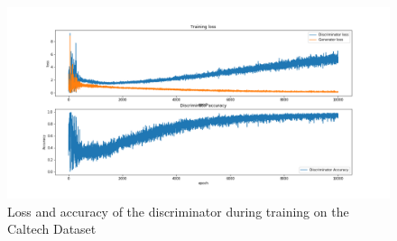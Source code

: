 \begin{figure}

\includegraphics[width=\textwidth]{fig/dcgan/caltech/loss}
  \caption{Loss and accuracy of the discriminator during training on the Caltech Dataset}
  \label{dcgan-caltech-loss}
\end{figure}
